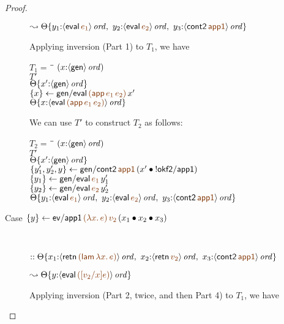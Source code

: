 \begin{proof}
\begin{description}
\qquad\qquad
  $\leadsto
   \tackon{\Theta}
     {y_1{:}\istrue{\susp{{\sf eval}\,\lf{e_1}}}, ~
      y_2{:}\istrue{\susp{{\sf eval}\,\lf{e_2}}}, ~
      y_3{:}\istrue{\susp{{\sf cont2}\,\lf{\sf app1}}}}$
\medskip

Applying inversion (Part 1) to $T_1$, we have 

\begin{tabbing}
$T_1 = ~$ \= \qquad \= $(x{:}{\langle {\sf gen} \rangle}\,{{\it ord}})$
\\
\>$T'$
\\
\>\>${\Theta}\{{x'{:}{\langle {\sf gen} \rangle}\,{{\it ord}}}\}$
\\
\>$\trstep{x}{{\sf gen/eval}\,\lf{({\sf app}\,e_1\,e_2)}\,x'}$
\\
\>\>$\tackon{\Theta}{x{:}\istrue{\susp{{\sf eval}\,\lf{({\sf app}\,e_1\,e_2)}}}}$
\end{tabbing}

We can use $T'$ to construct $T_2$ as follows:

\begin{tabbing}
$T_2 = ~$ \= \qquad \= $(x{:}{\langle {\sf gen} \rangle}\,{{\it ord}})$
\\
\>$T'$
\\
\>\>${\Theta}\{{x'{:}{\langle {\sf gen} \rangle}\,{{\it ord}}}\}$
\\
\>$\trstep{y_1',y_2',y}{{\sf gen/cont2}\,\lf{{\sf app1}}\,(\tfuser{x'}{\tbangr{{\sf okf2/app1}}})}$
\\
\>$\trstep{y_1}{{\sf gen/eval}\,\lf{e_1}\,y_1'}$
\\
\>$\trstep{y_2}{{\sf gen/eval}\,\lf{e_2}\,y_2'}$
\\
\>\>$\tackon{\Theta}{y_1{:}\istrue{\susp{{\sf eval}\,\lf{e_1}}}, ~
      y_2{:}\istrue{\susp{{\sf eval}\,\lf{e_2}}}, ~
      y_3{:}\istrue{\susp{{\sf cont2}\,\lf{\sf app1}}}}$
\end{tabbing}

\item 
  [Case $\trstep{y}{{\sf ev/app1}\,\lf{(\lambda x.\,e)}\,\lf{v_2}\,(\tfuser{x_1}{\tfuser{x_2}{x_3}})}$]~

\qquad
  $::
   \tackon{\Theta}{x_1{:}\istrue{\susp{{\sf retn}\,\lf{({\sf lam}\,\lambda x.\,e)}}}, ~
                   x_2{:}\istrue{\susp{{\sf retn}\,\lf{v_2}}}, ~
                   x_3{:}\istrue{\susp{{\sf cont2}\,\lf{\sf app1}}}}$

\qquad\qquad
  $\leadsto
   \tackon{\Theta}{y{:}\istrue{\susp{{\sf eval}\,\lf{([v_2/x]e)}}}}$

\medskip
Applying inversion (Part 2, twice, and then Part 4) to $T_1$, we have


\end{description}
\end{proof}
